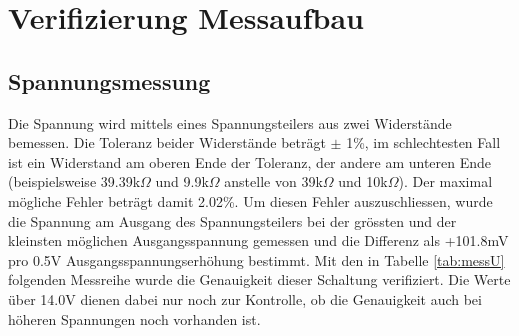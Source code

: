 \section{Verifizierung Messaufbau}

\subsection{Spannungsmessung}\label{subsec_messu}
Die Spannung wird mittels eines Spannungsteilers aus zwei Widerstände bemessen. Die Toleranz beider Widerstände beträgt $\pm$ 1\%, im schlechtesten Fall ist ein Widerstand am oberen Ende der Toleranz, der andere am unteren Ende (beispielsweise 39.39k$\Omega$ und 9.9k$\Omega$ anstelle von 39k$\Omega$ und 10k$\Omega$). Der maximal mögliche Fehler beträgt damit 2.02\%. \newline
Um diesen Fehler auszuschliessen, wurde die Spannung am Ausgang des Spannungsteilers bei der grössten und der kleinsten möglichen Ausgangsspannung gemessen und die Differenz als +101.8mV pro 0.5V Ausgangsspannungserhöhung bestimmt. Mit den in Tabelle \ref{tab:messU} folgenden Messreihe wurde die Genauigkeit dieser Schaltung verifiziert. Die Werte über 14.0V dienen dabei nur noch zur Kontrolle, ob die Genauigkeit auch bei höheren Spannungen noch vorhanden ist.
